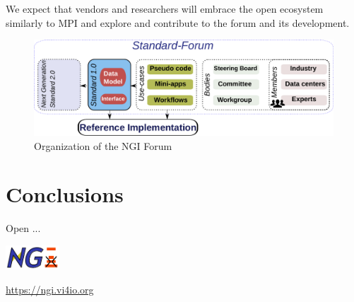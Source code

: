 \documentclass[a4paper, twocolumn]{article}
\begin{document}
We expect that vendors and researchers will embrace the open ecosystem similarly to MPI and explore and contribute to the forum and its development.

\begin{figure}[b]
  \includegraphics[width=\columnwidth]{standardization}
  \caption{Organization of the NGI Forum}
  \label{fig:standardization}
\end{figure}

\section{Conclusions}

Open ...

\includegraphics[width=2cm]{ngi-logo}

\noindent\url{https://ngi.vi4io.org}
\end{document}
